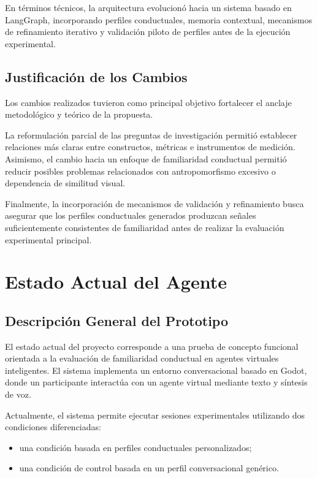 \documentclass[12pt]{article}
\begin{document}
En términos técnicos, la arquitectura evolucionó hacia un sistema basado en LangGraph, incorporando perfiles conductuales, memoria contextual, mecanismos de refinamiento iterativo y validación piloto de perfiles antes de la ejecución experimental.

\subsection{Justificación de los Cambios}

Los cambios realizados tuvieron como principal objetivo fortalecer el anclaje metodológico y teórico de la propuesta.

La reformulación parcial de las preguntas de investigación permitió establecer relaciones más claras entre constructos, métricas e instrumentos de medición. Asimismo, el cambio hacia un enfoque de familiaridad conductual permitió reducir posibles problemas relacionados con antropomorfismo excesivo o dependencia de similitud visual.

Finalmente, la incorporación de mecanismos de validación y refinamiento busca asegurar que los perfiles conductuales generados produzcan señales suficientemente consistentes de familiaridad antes de realizar la evaluación experimental principal.







\section{Estado Actual del Agente}

\subsection{Descripción General del Prototipo}

El estado actual del proyecto corresponde a una prueba de concepto funcional orientada a la evaluación de familiaridad conductual en agentes virtuales inteligentes. El sistema implementa un entorno conversacional basado en Godot, donde un participante interactúa con un agente virtual mediante texto y síntesis de voz.

Actualmente, el sistema permite ejecutar sesiones experimentales utilizando dos condiciones diferenciadas:

\begin{itemize}
\item una condición basada en perfiles conductuales personalizados;
\item una condición de control basada en un perfil conversacional genérico.
\end{itemize}
\end{document}
